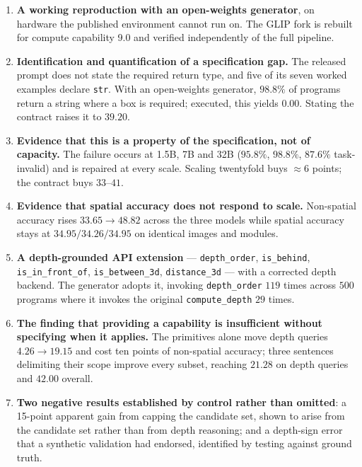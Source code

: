 \documentclass[12pt,a4paper,oneside]{report}
\begin{document}
\begin{enumerate}[leftmargin=2.0em, itemsep=5pt]
\item \textbf{A working reproduction with an open-weights generator}, on hardware the
published environment cannot run on. The GLIP fork is rebuilt for compute capability
9.0 and verified independently of the full pipeline.

\item \textbf{Identification and quantification of a specification gap.} The released
prompt does not state the required return type, and five of its seven worked examples
declare \texttt{str}. With an open-weights generator, $98.8\%$ of programs return a
string where a box is required; executed, this yields $0.00$. Stating the contract
raises it to $39.20$.

\item \textbf{Evidence that this is a property of the specification, not of capacity.}
The failure occurs at 1.5B, 7B and 32B ($95.8\%$, $98.8\%$, $87.6\%$ task-invalid) and
is repaired at every scale. Scaling twentyfold buys $\approx 6$ points; the contract
buys $33$--$41$.

\item \textbf{Evidence that spatial accuracy does not respond to scale.} Non-spatial
accuracy rises $33.65 \to 48.82$ across the three models while spatial accuracy stays
at $34.95 / 34.26 / 34.95$ on identical images and modules.

\item \textbf{A depth-grounded API extension} --- \texttt{depth\_order},
\texttt{is\_behind}, \texttt{is\_in\_front\_of}, \texttt{is\_between\_3d},
\texttt{distance\_3d} --- with a corrected depth backend. The generator adopts it,
invoking \texttt{depth\_order} $119$ times across $500$ programs where it invokes the
original \texttt{compute\_depth} $29$ times.

\item \textbf{The finding that providing a capability is insufficient without
specifying when it applies.} The primitives alone move depth queries $4.26 \to 19.15$
and cost ten points of non-spatial accuracy; three sentences delimiting their scope
improve every subset, reaching $21.28$ on depth queries and $42.00$ overall.

\item \textbf{Two negative results established by control rather than omitted}: a
15-point apparent gain from capping the candidate set, shown to arise from the
candidate set rather than from depth reasoning; and a depth-sign error that a
synthetic validation had endorsed, identified by testing against ground truth.
\end{enumerate}
\end{document}
